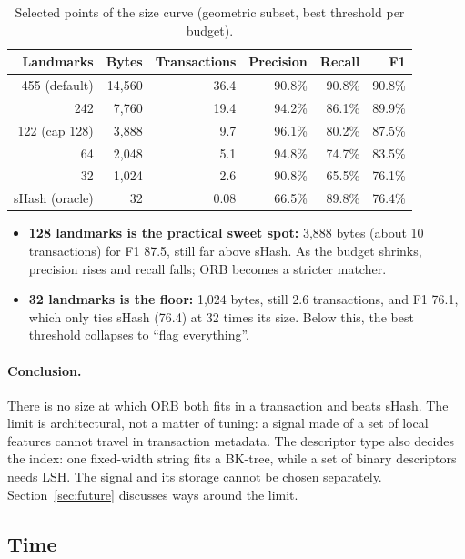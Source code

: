 \begin{table}[ht]
\centering
\begin{tabular}{@{}rrrrrr@{}}
\toprule
Landmarks & Bytes & Transactions & Precision & Recall & F1 \\
\midrule
455 (default) & 14,560 & 36.4 & 90.8\% & 90.8\% & 90.8\% \\
242           &  7,760 & 19.4 & 94.2\% & 86.1\% & 89.9\% \\
122 (cap 128) &  3,888 &  9.7 & 96.1\% & 80.2\% & 87.5\% \\
64            &  2,048 &  5.1 & 94.8\% & 74.7\% & 83.5\% \\
32            &  1,024 &  2.6 & 90.8\% & 65.5\% & 76.1\% \\
\midrule
sHash (oracle) & 32 & 0.08 & 66.5\% & 89.8\% & 76.4\% \\
\bottomrule
\end{tabular}
\caption{Selected points of the size curve (geometric subset, best threshold per budget).}
\label{tab:budget}
\end{table}

\begin{itemize}
  \item \textbf{128 landmarks is the practical sweet spot:} 3,888 bytes (about 10 transactions)
        for F1 87.5, still far above sHash. As the budget shrinks, precision rises and recall
        falls; ORB becomes a stricter matcher.
  \item \textbf{32 landmarks is the floor:} 1,024 bytes, still 2.6 transactions, and F1 76.1,
        which only ties sHash (76.4) at 32 times its size. Below this, the best threshold
        collapses to ``flag everything''.
\end{itemize}

\paragraph{Conclusion.} There is no size at which ORB both fits in a transaction and beats
sHash. The limit is architectural, not a matter of tuning: a signal made of a set of local
features cannot travel in transaction metadata. The descriptor type also decides the index:
one fixed-width string fits a BK-tree, while a set of binary descriptors needs LSH. The
signal and its storage cannot be chosen separately. Section~\ref{sec:future} discusses ways
around the limit.

\subsection{Time}
\label{sec:time}

